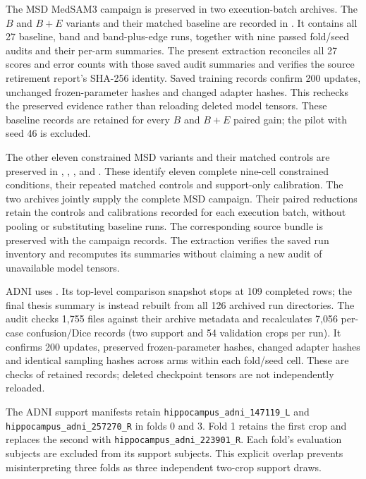 The MSD MedSAM3 campaign is preserved in two execution-batch archives.
The $B$ and $B+E$ variants and their matched baseline are recorded in
.
It contains all 27 baseline, band and band-plus-edge runs, together
with nine passed fold/seed audits and their per-arm summaries.
The present extraction reconciles all 27 scores and error counts with
those saved audit summaries and verifies the source retirement report's
SHA-256 identity. Saved training records confirm 200 updates, unchanged
frozen-parameter hashes and changed adapter hashes. This rechecks the
preserved evidence rather than reloading deleted model tensors.
These baseline records are retained for every $B$ and $B+E$ paired
gain; the pilot with seed 46 is excluded.

The other eleven constrained MSD variants and their matched controls
are preserved in
, ,
,  and
. These identify eleven complete nine-cell constrained
conditions, their repeated matched controls and support-only calibration.
The two archives jointly supply the complete MSD campaign. Their
paired reductions retain the controls and calibrations recorded for
each execution batch, without pooling or substituting baseline runs.
The corresponding source bundle is preserved with the campaign records.
The extraction verifies the saved run inventory and recomputes its
summaries without claiming a new audit of unavailable model tensors.

ADNI uses
.
Its top-level comparison snapshot stops at 109 completed rows; the
final thesis summary is instead rebuilt from all 126 archived run
directories. The audit checks 1,755 files against their archive
metadata and recalculates 7,056 per-case confusion/Dice records
(two support and 54 validation crops per run). It confirms 200 updates,
preserved frozen-parameter hashes, changed adapter
hashes and identical sampling hashes across arms within each fold/seed
cell. These are checks of retained records; deleted checkpoint tensors
are not independently reloaded.

The ADNI support manifests retain
\texttt{hippocampus\_adni\_147119\_L} and
\texttt{hippocampus\_adni\_257270\_R} in folds 0 and 3.
Fold 1 retains the first crop and replaces the second with
\texttt{hippocampus\_adni\_223901\_R}. Each fold's evaluation subjects
are excluded from its support subjects. This explicit overlap prevents
misinterpreting three folds as three independent two-crop support draws.

